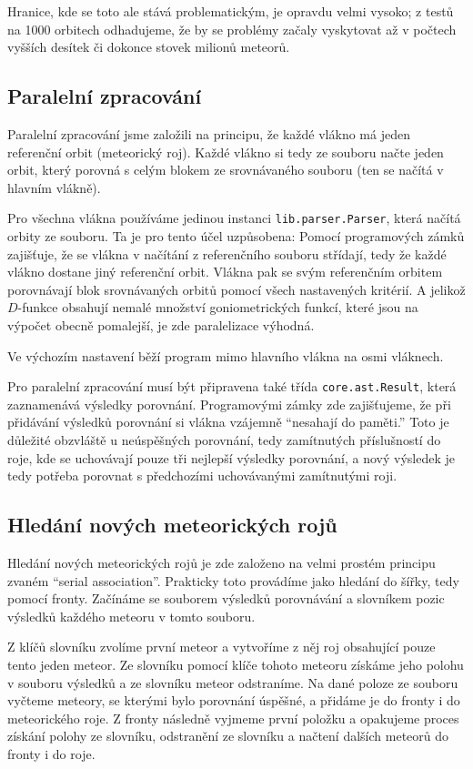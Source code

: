 Hranice, kde se toto ale stává problematickým, je opravdu velmi vysoko; z testů na 1000 orbitech odhadujeme, že by se problémy začaly vyskytovat až v počtech vyšších desítek či dokonce stovek milionů meteorů.

\subsection{Paralelní zpracování\label{sec:practical:parallel}}
Paralelní zpracování jsme založili na principu, že každé vlákno má jeden referenční orbit (meteorický roj). Každé vlákno si tedy ze souboru načte jeden orbit, který porovná s celým blokem ze srovnávaného souboru (ten se načítá v hlavním vlákně).

Pro všechna vlákna používáme jedinou instanci \texttt{lib.parser.Parser}, která načítá orbity ze souboru. Ta je pro tento účel uzpůsobena: Pomocí programových zámků zajišťuje, že se vlákna v načítání z referenčního souboru střídají, tedy že každé vlákno dostane jiný referenční orbit. Vlákna pak se svým referenčním orbitem porovnávají blok srovnávaných orbitů pomocí všech nastavených kritérií. A jelikož $D$-funkce obsahují nemalé množství goniometrických funkcí, které jsou na výpočet obecně pomalejší, je zde paralelizace výhodná.

Ve výchozím nastavení běží program mimo hlavního vlákna na osmi vláknech.

\medskip

Pro paralelní zpracování musí být připravena také třída \texttt{core.ast.Result}, která zaznamenává výsledky porovnání. Programovými zámky zde zajišťujeme, že při přidávání výsledků porovnání si vlákna vzájemně "`nesahají do paměti."' Toto je důležité obzvláště u neúspěšných porovnání, tedy zamítnutých příslušností do roje, kde se uchovávají pouze tři nejlepší výsledky porovnání, a nový výsledek je tedy potřeba porovnat s předchozími uchovávanými zamítnutými roji.

\subsection{Hledání nových meteorických rojů\label{sec:practical:association}}
Hledání nových meteorických rojů je zde založeno na velmi prostém principu zvaném "`serial association"'. Prakticky toto provádíme jako hledání do šířky, tedy pomocí fronty. Začínáme se souborem výsledků porovnávání a slovníkem pozic výsledků každého meteoru v tomto souboru.

Z klíčů slovníku zvolíme první meteor a vytvoříme z něj roj obsahující pouze tento jeden meteor. Ze slovníku pomocí klíče tohoto meteoru získáme jeho polohu v souboru výsledků a ze slovníku meteor odstraníme. Na dané poloze ze souboru vyčteme meteory, se kterými bylo porovnání úspěšné, a přidáme je do fronty i do meteorického roje. Z fronty následně vyjmeme první položku a opakujeme proces získání polohy ze slovníku, odstranění ze slovníku a načtení dalších meteorů do fronty i do roje.

